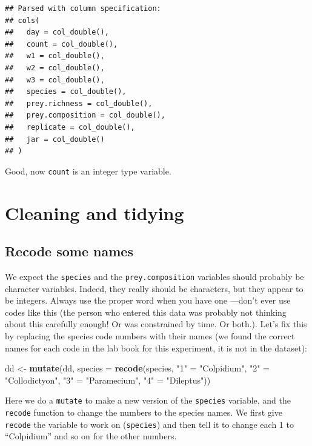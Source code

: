 \documentclass[]{book}
\newenvironment{Shaded}{\begin{snugshade}}{\end{snugshade}}
\newcommand{\DataTypeTok}[1]{\textcolor[rgb]{0.13,0.29,0.53}{#1}}
\newcommand{\KeywordTok}[1]{\textcolor[rgb]{0.13,0.29,0.53}{\textbf{#1}}}
\newcommand{\NormalTok}[1]{#1}
\newcommand{\StringTok}[1]{\textcolor[rgb]{0.31,0.60,0.02}{#1}}
\begin{document}
\begin{verbatim}
## Parsed with column specification:
## cols(
##   day = col_double(),
##   count = col_double(),
##   w1 = col_double(),
##   w2 = col_double(),
##   w3 = col_double(),
##   species = col_double(),
##   prey.richness = col_double(),
##   prey.composition = col_double(),
##   replicate = col_double(),
##   jar = col_double()
## )
\end{verbatim}

Good, now \texttt{count} is an integer type variable.

\hypertarget{cleaning-and-tidying}{%
\section{Cleaning and tidying}\label{cleaning-and-tidying}}

\hypertarget{recode-some-names}{%
\subsection{Recode some names}\label{recode-some-names}}

We expect the \texttt{species} and the \texttt{prey.composition} variables should probably be character variables. Indeed, they really should be characters, but they appear to be integers. Always use the proper word when you have one ---don't ever use codes like this (the person who entered this data was probably not thinking about this carefully enough! Or was constrained by time. Or both.). Let's fix this by replacing the species code numbers with their names (we found the correct names for each code in the lab book for this experiment, it is not in the dataset):

\begin{Shaded}
\begin{Highlighting}[]
\NormalTok{dd <-}\StringTok{ }\KeywordTok{mutate}\NormalTok{(dd, }\DataTypeTok{species =} \KeywordTok{recode}\NormalTok{(species,}
                                \StringTok{"1"}\NormalTok{ =}\StringTok{ "Colpidium"}\NormalTok{,}
                                \StringTok{"2"}\NormalTok{ =}\StringTok{ "Collodictyon"}\NormalTok{,}
                                \StringTok{"3"}\NormalTok{ =}\StringTok{ "Paramecium"}\NormalTok{,}
                                \StringTok{"4"}\NormalTok{ =}\StringTok{ "Dileptus"}\NormalTok{))}
\end{Highlighting}
\end{Shaded}

Here we do a \texttt{mutate} to make a new version of the \texttt{species} variable, and the \texttt{recode} function to change the numbers to the species names. We first give \texttt{recode} the variable to work on (\texttt{species}) and then tell it to change each 1 to ``Colpidium'' and so on for the other numbers.
\end{document}
